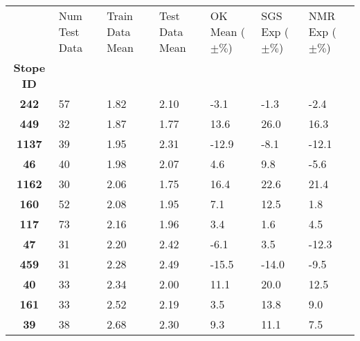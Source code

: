 \begin{tabular}{c*{6}{p{1.5cm}}}
\toprule
{} & Num Test Data & Train Data Mean & Test Data Mean & OK Mean ($\pm\%$) & SGS Exp ($\pm\%$) & NMR Exp ($\pm\%$) \\
\textbf{Stope ID} &               &                 &                &                   &                   &                   \\
\midrule
\textbf{242     } &            57 &            1.82 &           2.10 &              -3.1 &              -1.3 &              -2.4 \\
\textbf{449     } &            32 &            1.87 &           1.77 &              13.6 &              26.0 &              16.3 \\
\textbf{1137    } &            39 &            1.95 &           2.31 &             -12.9 &              -8.1 &             -12.1 \\
\textbf{46      } &            40 &            1.98 &           2.07 &               4.6 &               9.8 &              -5.6 \\
\textbf{1162    } &            30 &            2.06 &           1.75 &              16.4 &              22.6 &              21.4 \\
\textbf{160     } &            52 &            2.08 &           1.95 &               7.1 &              12.5 &               1.8 \\
\textbf{117     } &            73 &            2.16 &           1.96 &               3.4 &               1.6 &               4.5 \\
\textbf{47      } &            31 &            2.20 &           2.42 &              -6.1 &               3.5 &             -12.3 \\
\textbf{459     } &            31 &            2.28 &           2.49 &             -15.5 &             -14.0 &              -9.5 \\
\textbf{40      } &            33 &            2.34 &           2.00 &              11.1 &              20.0 &              12.5 \\
\textbf{161     } &            33 &            2.52 &           2.19 &               3.5 &              13.8 &               9.0 \\
\textbf{39      } &            38 &            2.68 &           2.30 &               9.3 &              11.1 &               7.5 \\
\bottomrule
\end{tabular}
